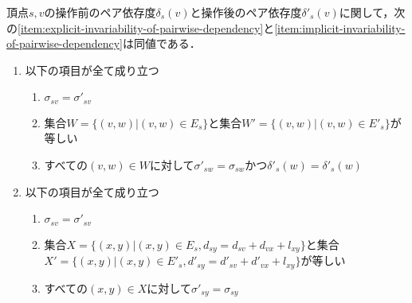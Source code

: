 \begin{lemma}
  \label{lemma:transformation-of-invariability-of-pairwise-dependency}
  頂点$s,v$の操作前のペア依存度$\delta_s(v)$と操作後のペア依存度$\delta'_s(v)$に関して，次の\ref{item:explicit-invariability-of-pairwise-dependency}と\ref{item:implicit-invariability-of-pairwise-dependency}は同値である．
  \begin{enumerate}[label=(\alph*)]
  \item 以下の項目が全て成り立つ
    \label{item:explicit-invariability-of-pairwise-dependency}
    \begin{enumerate}[label=\arabic*.]
    \item $\sigma_{sv}=\sigma'_{sv}$
    \item 集合$W=\{(v,w)|(v,w)\in E_s\}$と集合$W'=\{(v,w)|(v,w)\in E'_s\}$が等しい
    \item すべての$(v,w)\in W$に対して$\sigma'_{sw}=\sigma_{sw}$かつ$\delta'_s(w)=\delta'_s(w)$
    \end{enumerate}
  \item 以下の項目が全て成り立つ
    \label{item:implicit-invariability-of-pairwise-dependency}
    \begin{enumerate}[label=\arabic*.]
    \item $\sigma_{sv}=\sigma'_{sv}$
    \item 集合$X=\{(x,y)|(x,y)\in E_s,d_{sy}=d_{sv}+d_{vx}+l_{xy}\}$と集合$X'=\{(x,y)|(x,y)\in E'_s,d'_{sy}=d'_{sv}+d'_{vx}+l_{xy}\}$が等しい
    \item すべての$(x,y)\in X$に対して$\sigma'_{sy}=\sigma_{sy}$
    \end{enumerate}
  \end{enumerate}
\end{lemma}
